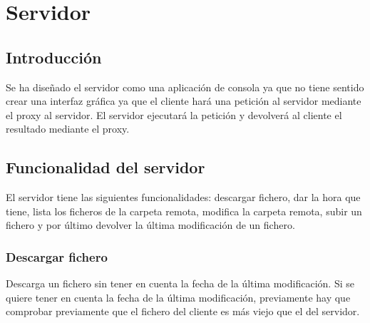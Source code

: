\chapter{Servidor}
\section{Introducción}
Se ha diseñado el servidor como una aplicación de consola ya que no tiene sentido crear una interfaz gráfica ya que el cliente hará una petición al servidor mediante el proxy al servidor. El servidor ejecutará la petición y devolverá al cliente el resultado mediante el proxy.

\section{Funcionalidad del servidor}
El servidor tiene las siguientes funcionalidades: descargar fichero, dar la hora que tiene, lista los ficheros de la carpeta remota, modifica la carpeta remota, subir un fichero y por último devolver la última modificación de un fichero.

\subsection{Descargar fichero}
Descarga un fichero sin tener en cuenta la fecha de la última modificación. Si se quiere tener en cuenta la fecha de la última modificación, previamente hay que comprobar previamente que el fichero del cliente es más viejo que el del servidor.\\
\inputminted[bgcolor=claro,firstline=113,lastline=140]{java}{/home/juan/IdeaProjects/ficherormi/src/main/java/Servidor.java}